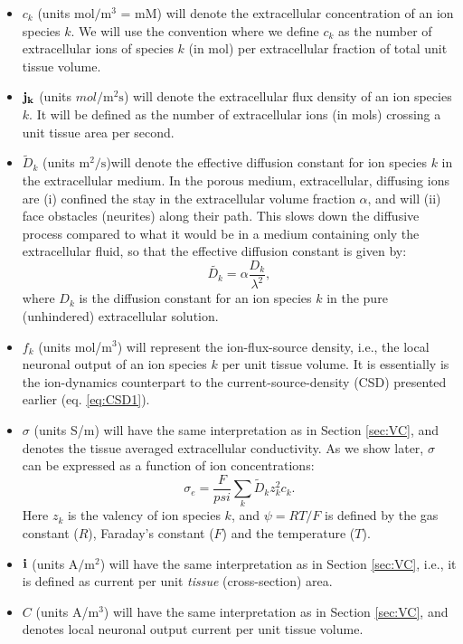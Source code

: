 \begin{itemize}
\item $c_k$ (units $\mathrm{mol/m^3}$ = mM) will denote the extracellular concentration of an ion species $k$. We will use the convention where we define $c_k$ as the number of extracellular ions of species $k$ (in mol) per extracellular fraction of total unit tissue volume. 

\item ${\bf j_k}$ (units $mol/\mathrm{m^2s}$) will denote the extracellular flux density of an ion species $k$. It will be defined as the number of extracellular ions (in mols) crossing a unit tissue area per second. 

\item $\tilde{D}_k$ (units $\mathrm{m^2/s}$)will denote the effective diffusion constant for ion species $k$ in the extracellular medium. In the porous medium, extracellular, diffusing ions are (i) confined the stay in the extracellular volume fraction $\alpha$, and will (ii) face obstacles (neurites) along their path. This slows down the diffusive process compared to what it would be in a medium containing only the extracellular fluid, so that the effective diffusion constant is given by:
\begin{equation}
\tilde{D_k} = \alpha \frac{D_k}{\lambda^2}, 
\label{eq:diffconst}
\end{equation}
where $D_k$ is the diffusion constant for an ion species $k$ in the pure (unhindered) extracellular solution.

\item $f_k$ (units mol/m$^3$) will represent the ion-flux-source density, i.e., the local neuronal output of an ion species $k$ per unit tissue volume. It is essentially is the ion-dynamics counterpart to the current-source-density (CSD) presented earlier (eq. \ref{eq:CSD1}).

\item $\sigma$ (units S/m) will have the same interpretation as in Section \ref{sec:VC}, and denotes the tissue averaged extracellular conductivity. As we show later, $\sigma$ can be expressed as a function of ion concentrations:
\begin{equation}
\sigma_e = \frac{F}{psi}\sum_{k} \tilde{D}_k z_{k}^2 c_{k}.
\label{eq:sigma1}
\end{equation}
Here $z_{k}$ is the valency of ion species $k$, and $\psi=RT/F$ is defined by the gas constant ($R$), Faraday's constant ($F$) and the temperature ($T$).

\item  ${\bf i}$ (units $\mathrm{A/m^2}$) will have the same interpretation as in Section \ref{sec:VC}, i.e., it is defined as current per unit \textit{tissue} (cross-section) area.

\item $C$ (units A/m$^3$) will have the same interpretation as in Section \ref{sec:VC}, and denotes local neuronal output current per unit tissue volume.

\end{itemize}

